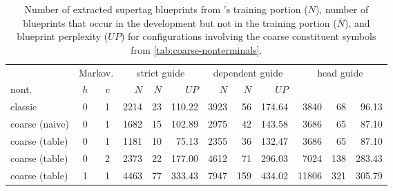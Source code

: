 \documentclass[../../document.tex]{subfiles}
\begin{document}
    \begin{table}
        \caption{\label{tbl:gridsearch:coarse:1}
        Number of extracted supertag blueprints from \negra{}'s training portion ($N$), number of blueprints that occur in the development but not in the training portion ($\overline{N}$), and blueprint perplexity ($\mathit{UP}$) for configurations involving the coarse constituent symbols from \cref{tab:coarse-nonterminals}.
        }
        \centering
        \setlength{\tabcolsep}{5pt}
        \vspace{.2cm}
        \begin{tabular}{lcc|rrr|rrr|rrr}
            \toprule
& \multicolumn{2}{c|}{Markov.}         & \multicolumn{3}{c|}{strict guide} &  \multicolumn{3}{c|}{dependent guide} &  \multicolumn{3}{c}{head guide} \\
nont.           & \(h\) & \(v\) & $N$ & $\overline{N}$ & $\mathit{UP}$ & $N$ & $\overline{N}$ & $\mathit{UP}$  \\ \hline \rowcolor{black!10}
classic        & 0 & 1 & 2214 & 23 & 110.22 & 3923 & 56 & 174.64 & 3840 & 68 & 96.13 \\\rowcolor{black!10}
coarse (naive) & 0 & 1 & 1682 & 15 & 102.89 & 2975 & 42 & 143.58 & 3686 & 65 & 87.10 \\\hline
coarse (table) & 0 & 1 & 1181 & 10 & 75.13 & 2355 & 36 & 132.47 & 3686 & 65 & 87.10 \\
coarse (table) & 0 & 2 & 2373 & 22 & 177.00 & 4612 & 71 & 296.03 & 7024 & 138 & 283.43 \\
coarse (table) & 1 & 1 & 4463 & 77 & 333.43 & 7947 & 159 & 434.02 & 11806 & 321 & 305.79 \\
\bottomrule
        \end{tabular}
    \end{table}
\end{document}

